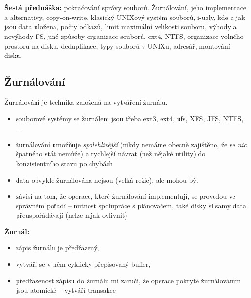 \documentclass[a4paper, 11pt]{article}
\begin{document}
\newpage

\section{}
\textbf{Šestá přednáška:} pokračování správy souborů. Žurnálování, jeho implementace a alternativy, copy-on-write, klasický UNIXový systém souborů, i-uzly, kde a jak jsou data uložena, počty odkazů, limit maximální velikosti souboru, výhody a nevýhody FS, jiné způsoby organizace souborů, ext4, NTFS, organizace volného prostoru na disku, deduplikace, typy souborů v UNIXu, adresář, montování disku.

\subsection{Žurnálování}
Žurnálování je technika založená na vytváření žurnálu.

\begin{itemize}
    \item souborové systémy se žurnálem jsou třeba ext3, ext4, ufs, XFS, JFS, NTFS, \ldots
    \item žurnálování umožňuje \textit{spolehlivější} (nikdy nemáme obecně zajištěno, že se \textit{nic} špatného stát nemůže) a rychlejší návrat (než nějaké utility) do konzistentního stavu po chybách
    \item data obvykle žurnálována nejsou (velká režie), ale mohou být
    \item závisí na tom, že operace, které žurnálování implementují, se provedou ve správném pořadí -- nutnost spolupráce s plánovačem, také disky si samy data přeuspořádávají (nelze nijak ovlivnit)
\end{itemize}
 
\textbf{Žurnál:}
\begin{itemize}
    \item zápis žurnálu je předřazený,
    \item vytváří se v něm cyklicky přepisovaný buffer,
    \item předřazenost zápisu do žurnálu mi zaručí, že operace pokryté žurnálováním jsou atomické -- vytváří transakce
\end{itemize}
 
\end{document}
